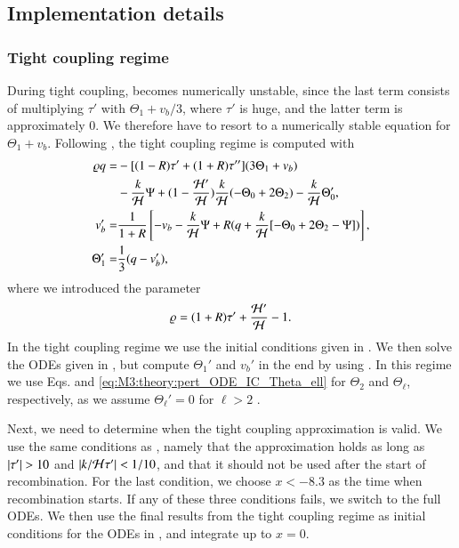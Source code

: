 \subsection{Implementation details}\label{ssec:M3:implementations} 
\subsubsection{Tight coupling regime} \label{sssec:M3:implementations:tight_coupling_regime}
During tight coupling,  becomes numerically unstable, since the last term consists of multiplying $\tau'$ with $\Theta_1+v_b/3$, where $\tau'$ is huge, and the latter term is approximately $0$. We therefore have to resort to a numerically stable equation for $\Theta_1 + v_b$. Following \citeauthor{callin}, the tight coupling regime is computed with 
\begin{subequations} \label{eq:M3:implementations:TC_ODEs}
    \begin{align}
        \varrho q =& -[(1-R)\tau' + (1+R)\tau''](3\Theta_1 + v_b) \nonumber \\
            & -\frac{k}{\mathcal{H}}\Psi + (1-\frac{\mathcal{H}'}{\mathcal{H}})\frac{k}{\mathcal{H}}(-\Theta_0 + 2\Theta_2) - \frac{k}{\mathcal{H}}\Theta_0', \label{eq:M3:implementations:TC_ODEs_q} \\
        v_b' =& \frac{1}{1+R}\left[ -v_b-\frac{k}{\mathcal{H}}\Psi + R(q+\frac{k}{\mathcal{H}}[-\Theta_0+2\Theta_2-\Psi]) \right], \label{eq:M3:implementations:TC_ODEs_v_b} \\
        \Theta_1' =& \frac{1}{3}(q-v_b'), \label{eq:M3:implementations:TC_ODEs_Theta_1} 
    \end{align}
\end{subequations}
where we introduced the parameter 
\begin{equation} \label{eq:M3:implementations:q_prefactor}
    \varrho = (1+R)\tau' + \frac{\mathcal{H}'}{\mathcal{H}} - 1.
\end{equation}
In the tight coupling regime we use the initial conditions given in . We then solve the ODEs given in , but compute $\Theta_1'$ and $v_b'$ in the end by using . In this regime we use Eqs.  and \eqref{eq:M3:theory:pert_ODE_IC_Theta_ell} for $\Theta_2$ and $\Theta_\ell$, respectively, as we assume $\Theta_\ell'=0$ for $\ell>2$ . 

Next, we need to determine when the tight coupling approximation is valid. We use the same conditions as \citeauthor{callin}, namely that the approximation holds as long as $\abs{\tau'}>10$ and $\abs{k/\mathcal{H}\tau'}<1/10$, and that it should not be used after the start of recombination. For the last condition, we choose $x<-8.3$ as the time when recombination starts. If any of these three conditions fails, we switch to the full ODEs. We then use the final results from the tight coupling regime as initial conditions for the ODEs in , and integrate up to $x=0$. 

